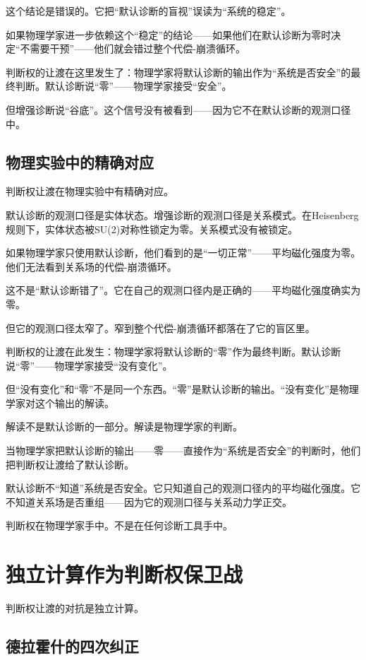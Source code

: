 \documentclass[11pt,a4paper]{book}
\theoremstyle{definition}
\begin{document}
这个结论是错误的。它把“默认诊断的盲视”误读为“系统的稳定”。

如果物理学家进一步依赖这个“稳定”的结论——如果他们在默认诊断为零时决定“不需要干预”——他们就会错过整个代偿-崩溃循环。

判断权的让渡在这里发生了：物理学家将默认诊断的输出作为“系统是否安全”的最终判断。默认诊断说“零”——物理学家接受“安全”。

但增强诊断说“谷底”。这个信号没有被看到——因为它不在默认诊断的观测口径中。

\subsection{物理实验中的精确对应}

判断权让渡在物理实验中有精确对应。

默认诊断的观测口径是实体状态。增强诊断的观测口径是关系模式。在Heisenberg规则下，实体状态被SU(2)对称性锁定为零。关系模式没有被锁定。

如果物理学家只使用默认诊断，他们看到的是“一切正常”——平均磁化强度为零。他们无法看到关系场的代偿-崩溃循环。

这不是“默认诊断错了”。它在自己的观测口径内是正确的——平均磁化强度确实为零。

但它的观测口径太窄了。窄到整个代偿-崩溃循环都落在了它的盲区里。

判断权的让渡在此发生：物理学家将默认诊断的“零”作为最终判断。默认诊断说“零”——物理学家接受“没有变化”。

但“没有变化”和“零”不是同一个东西。“零”是默认诊断的输出。“没有变化”是物理学家对这个输出的解读。

解读不是默认诊断的一部分。解读是物理学家的判断。

当物理学家把默认诊断的输出——零——直接作为“系统是否安全”的判断时，他们把判断权让渡给了默认诊断。

默认诊断不“知道”系统是否安全。它只知道自己的观测口径内的平均磁化强度。它不知道关系场是否重组——因为它的观测口径与关系动力学正交。

判断权在物理学家手中。不是在任何诊断工具手中。

\section{独立计算作为判断权保卫战}

判断权让渡的对抗是独立计算。

\subsection{德拉霍什的四次纠正}\label{subsec:four-corrections}
\end{document}
